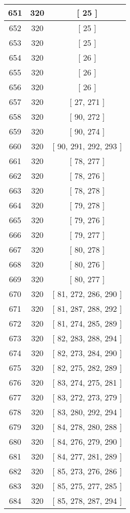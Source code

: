 \begin{center}
\begin{longtable}[H]{|| c c c ||}
651 & 320 & [ 25 ]
\\\hline
652 & 320 & [ 25 ]
\\\hline
653 & 320 & [ 25 ]
\\\hline
654 & 320 & [ 26 ]
\\\hline
655 & 320 & [ 26 ]
\\\hline
656 & 320 & [ 26 ]
\\\hline
657 & 320 & [ 27, 271 ]
\\\hline
658 & 320 & [ 90, 272 ]
\\\hline
659 & 320 & [ 90, 274 ]
\\\hline
660 & 320 & [ 90, 291, 292, 293 ]
\\\hline
661 & 320 & [ 78, 277 ]
\\\hline
662 & 320 & [ 78, 276 ]
\\\hline
663 & 320 & [ 78, 278 ]
\\\hline
664 & 320 & [ 79, 278 ]
\\\hline
665 & 320 & [ 79, 276 ]
\\\hline
666 & 320 & [ 79, 277 ]
\\\hline
667 & 320 & [ 80, 278 ]
\\\hline
668 & 320 & [ 80, 276 ]
\\\hline
669 & 320 & [ 80, 277 ]
\\\hline
670 & 320 & [ 81, 272, 286, 290 ]
\\\hline
671 & 320 & [ 81, 287, 288, 292 ]
\\\hline
672 & 320 & [ 81, 274, 285, 289 ]
\\\hline
673 & 320 & [ 82, 283, 288, 294 ]
\\\hline
674 & 320 & [ 82, 273, 284, 290 ]
\\\hline
675 & 320 & [ 82, 275, 282, 289 ]
\\\hline
676 & 320 & [ 83, 274, 275, 281 ]
\\\hline
677 & 320 & [ 83, 272, 273, 279 ]
\\\hline
678 & 320 & [ 83, 280, 292, 294 ]
\\\hline
679 & 320 & [ 84, 278, 280, 288 ]
\\\hline
680 & 320 & [ 84, 276, 279, 290 ]
\\\hline
681 & 320 & [ 84, 277, 281, 289 ]
\\\hline
682 & 320 & [ 85, 273, 276, 286 ]
\\\hline
683 & 320 & [ 85, 275, 277, 285 ]
\\\hline
684 & 320 & [ 85, 278, 287, 294 ]
\\\hline

\end{longtable}
\end{center}
